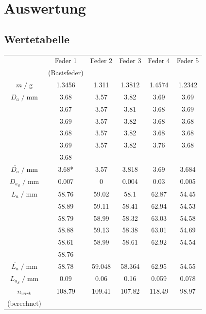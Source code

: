 \newpage
\section{Auswertung}
\subsection{Wertetabelle}
\begin{table}[H]
    \centering
    \begin{tabular}{c | c c c c c}
        \toprule
        & Feder 1 & Feder 2 & Feder 3 & Feder 4 & Feder 5 \\ & (Basisfeder)\\
        \midrule
        $m\;/\;$g & 1.3456 & 1.311 & 1.3812 & 1.4574 & 1.2342 \\
        \midrule
        $D_a\;/\;$mm & 3.68 & 3.57 & 3.82 & 3.69 & 3.69 \\
          & 3.67 & 3.57 & 3.81 & 3.68 & 3.69 \\
          & 3.69 & 3.57 & 3.82 & 3.68 & 3.68 \\
          & 3.68 & 3.57 & 3.82 & 3.68 & 3.68 \\
          & 3.69 & 3.57 & 3.82 & 3.76 & 3.68 \\
          & 3.68 &         &         &         &         \\
        \midrule
        $\bar{D_a}\;/\;$mm & 3.68* & 3.57 & 3.818 & 3.69 & 3.684\\
        $D_{a_S}\;/\;$mm& 0.007 & 0 & 0.004 & 0.03 & 0.005\\
        \midrule
        $L_a\;/\;$mm & 58.76 & 59.02 & 58.1 & 62.87 & 54.45 \\
          & 58.89 & 59.11 & 58.41 & 62.94 & 54.53 \\
          & 58.79 & 58.99 & 58.32 & 63.03 & 54.58 \\
          & 58.88 & 59.13 & 58.38 & 63.01 & 54.69 \\
          & 58.61 & 58.99 & 58.61 & 62.92 & 54.54 \\
          & 58.76 &         &         &         &         \\
        \midrule
        $\bar{L_a}\;/\;$mm & 58.78 & 59.048 & 58.364 & 62.95 & 54.55\\
        $L_{a_S}\;/\;$mm & 0.09 & 0.06 & 0.16 & 0.059 & 0.078\\
        $n_{wirk}$ & 108.79 & 109.41 & 107.82 & 118.49 & 98.97 \\(berechnet)\\
        \midrule

\end{tabular}
\end{table}
